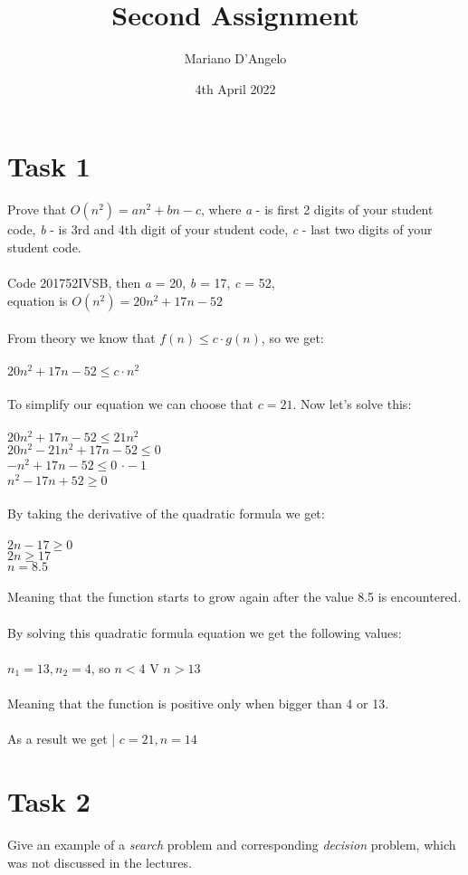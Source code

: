 \documentclass[12pt]{article}
\title{Second Assignment}
\author{Mariano D'Angelo}
\date{4th April 2022}
\begin{document}
\maketitle


\section*{Task 1}
Prove that $O(n^2)= an^2 + bn - c$, where \textit{a} - is first 2 digits of your student
code, \textit{b} - is 3rd and 4th digit of your student code, \textit{c} - last 
two digits of your student code. \\\\
Code 201752IVSB, then \textit{a} = 20, \textit{b} = 17, \textit{c} = 52, \\
equation is $O(n^2) = 20n^2 + 17n - 52$ \\\\
From theory we know that $f(n) \le c \cdot g(n)$, so we get: \\\\
$20n^2 + 17n - 52 \le c \cdot n^2$ \\\\
To simplify our equation we can choose that $c = 21$. Now let's solve this:\\\\
$20n^2 + 17n - 52 \le 21n^2$ \\
$20n^2 - 21n^2 + 17n - 52 \le 0$ \\
$- n^2 + 17n - 52 \le 0$ \textbar{} $\cdot -1$\\
$n^2 - 17n + 52 \ge 0$ \\\\
By taking the derivative of the quadratic formula we get: \\\\
$2n - 17 \ge 0$ \\
$2n \ge 17$ \\
$n = 8.5$ \\\\
Meaning that the function starts to grow again after the value 8.5 is encountered. \\\\
By solving this quadratic formula equation we get the following values: \\\\
$n_1 = 13, n_2 = 4$, so $n < 4$ V $n > 13$ \\\\
Meaning that the function is positive only when bigger than 4 or 13. \\\\
As a result we get | $c = 21, n = 14$


\section*{Task 2}
Give an example of a \textit{search} problem and corresponding \textit{decision} problem,
which was not discussed in the lectures. \\\\
\end{document}
